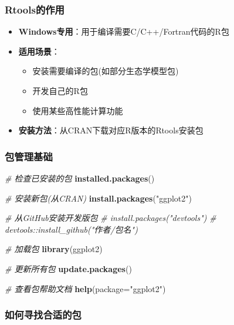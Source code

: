 \documentclass[
]{book}
\newenvironment{Shaded}{\begin{snugshade}}{\end{snugshade}}
\newcommand{\AttributeTok}[1]{\textcolor[rgb]{0.13,0.29,0.53}{#1}}
\newcommand{\CommentTok}[1]{\textcolor[rgb]{0.56,0.35,0.01}{\textit{#1}}}
\newcommand{\FunctionTok}[1]{\textcolor[rgb]{0.13,0.29,0.53}{\textbf{#1}}}
\newcommand{\NormalTok}[1]{#1}
\newcommand{\StringTok}[1]{\textcolor[rgb]{0.31,0.60,0.02}{#1}}
\providecommand{\tightlist}{%
  \setlength{\itemsep}{0pt}\setlength{\parskip}{0pt}}
\begin{document}
\hypertarget{rtoolsux7684ux4f5cux7528}{%
\subsubsection{Rtools的作用}\label{rtoolsux7684ux4f5cux7528}}

\begin{itemize}
\tightlist
\item
  \textbf{Windows专用}：用于编译需要C/C++/Fortran代码的R包
\item
  \textbf{适用场景}：

  \begin{itemize}
  \tightlist
  \item
    安装需要编译的包(如部分生态学模型包)
  \item
    开发自己的R包
  \item
    使用某些高性能计算功能
  \end{itemize}
\item
  \textbf{安装方法}：从CRAN下载对应R版本的Rtools安装包
\end{itemize}

\hypertarget{ux5305ux7ba1ux7406ux57faux7840}{%
\subsubsection{包管理基础}\label{ux5305ux7ba1ux7406ux57faux7840}}

\begin{Shaded}
\begin{Highlighting}[]
\CommentTok{\# 检查已安装的包}
\FunctionTok{installed.packages}\NormalTok{()}

\CommentTok{\# 安装新包(从CRAN)}
\FunctionTok{install.packages}\NormalTok{(}\StringTok{"ggplot2"}\NormalTok{) }

\CommentTok{\# 从GitHub安装开发版包}
\CommentTok{\# install.packages("devtools")}
\CommentTok{\# devtools::install\_github("作者/包名")}

\CommentTok{\# 加载包}
\FunctionTok{library}\NormalTok{(ggplot2)}

\CommentTok{\# 更新所有包}
\FunctionTok{update.packages}\NormalTok{()}

\CommentTok{\# 查看包帮助文档}
\FunctionTok{help}\NormalTok{(}\AttributeTok{package=}\StringTok{"ggplot2"}\NormalTok{)}
\end{Highlighting}
\end{Shaded}

\hypertarget{ux5982ux4f55ux5bfbux627eux5408ux9002ux7684ux5305}{%
\subsubsection{如何寻找合适的包}\label{ux5982ux4f55ux5bfbux627eux5408ux9002ux7684ux5305}}
\end{document}
